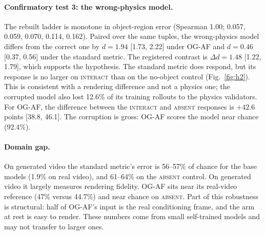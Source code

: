 \documentclass[10pt]{article}
\newcommand{\cond}[1]{\textsc{#1}}
\begin{document}
\paragraph{Confirmatory test 3: the wrong-physics model.} The rebuilt ladder is
monotone in object-region error (Spearman 1.00; 0.057, 0.059, 0.070, 0.114, 0.162).
Paired over the same tuples, the wrong-physics model differs from the correct one by
$d=1.94$ [1.73, 2.22] under OG-AF and $d=0.46$ [0.37, 0.56] under the standard metric.
The registered contrast is $\Delta d=1.48$ [1.22, 1.79], which supports the
hypothesis. The standard metric does respond, but its response is no larger on
\cond{interact} than on the no-object control (Fig.~\ref{fig:h2}). This is consistent
with a rendering difference and not a physics one; the corrupted model also lost 12.6\%
of its training rollouts to the physics validators. For OG-AF, the difference between the
\cond{interact} and \cond{absent} responses is $+42.6$ points [38.8, 46.1]. The corruption is gross: OG-AF scores the
model near chance (92.4\%).

\paragraph{Domain gap.} On generated video the standard metric's error is 56--57\% of
chance for the base models (1.9\% on real video), and 61--64\% on the \cond{absent}
control. On generated video it largely measures rendering fidelity. OG-AF sits near its
real-video reference (47\% versus 44.7\%) and near chance on \cond{absent}. Part of this
robustness is structural: half of OG-AF's input is the real conditioning frame, and the
arm at rest is easy to render. These numbers come from small self-trained models and may
not transfer to larger ones.
\end{document}

